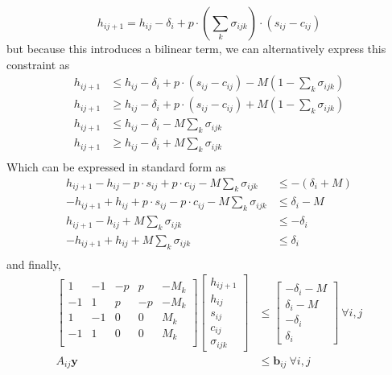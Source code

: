 \begin{equation}
	h_{ij+1} = h_{ij} - \delta_i + p\cdot\left(\sum_k\sigma_{ijk}\right )\cdot(s_{ij} - c_{ij}) 
\end{equation}
but because this introduces a bilinear term, we can alternatively express this constraint as
\begin{equation} \begin{aligned}
	h_{ij+1} & \le h_{ij} - \delta_i + p\cdot(s_{ij} - c_{ij}) - M(1 - \sum_k\sigma_{ijk})\\
	h_{ij+1} & \ge h_{ij} - \delta_i + p\cdot(s_{ij} - c_{ij}) + M(1 - \sum_k\sigma_{ijk})\\
	h_{ij+1} & \le h_{ij} - \delta_i - M\sum_k\sigma_{ijk}\\
	h_{ij+1} & \ge h_{ij} - \delta_i + M\sum_k\sigma_{ijk}\\
\end{aligned} \end{equation}
Which can be expressed in standard form as
\begin{equation} \begin{aligned}
	 h_{ij+1} - h_{ij} - p\cdot s_{ij} + p\cdot c_{ij} - M\sum_k\sigma_{ijk} &\le -\left(\delta_i + M\right) \\
	-h_{ij+1} + h_{ij} + p\cdot s_{ij} - p\cdot c_{ij} - M\sum_k\sigma_{ijk} &\le \delta_i - M \\
	 h_{ij+1} - h_{ij} + M\sum_k\sigma_{ijk} &\le -\delta_i \\
	-h_{ij+1} + h_{ij} + M\sum_k\sigma_{ijk} & \le \delta_i \\
\end{aligned} \end{equation}
and finally,
\begin{equation} \label{eqn:socDynamic1} \begin{aligned}
	\begin{bmatrix}1  & -1 & -p & p   & -M_k \\
		       -1 & 1  & p  & -p  & -M_k \\
		       1  & -1 & 0             & 0              & M_k  \\
		       -1 & 1  & 0             & 0              & M_k  \\
	\end{bmatrix}
	\begin{bmatrix}h_{ij+1} \\ h_{ij} \\ s_{ij} \\ c_{ij} \\ \sigma_{ijk} \end{bmatrix} &\le 
		\begin{bmatrix}-\delta_i - M \\ \delta_i - M \\ -\delta_i \\ \delta_i \end{bmatrix} \ \forall i,j \\
			A_{ij}\mathbf{y} &\le \mathbf{b}_{ij} \ \forall i,j
\end{aligned} \end{equation}
